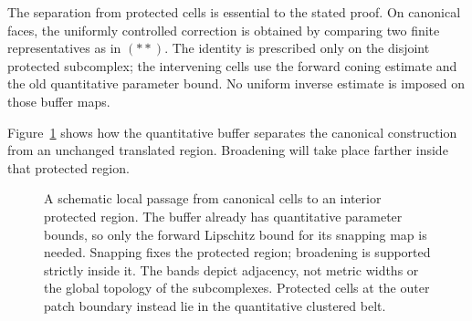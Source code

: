 \documentclass[11pt]{article}
\numberwithin{equation}{section}
\theoremstyle{definition}
\theoremstyle{remark}
\newcommand{\Id}{\operatorname{id}}
\begin{document}
The separation from protected cells is essential to the stated
proof.  On canonical faces, the uniformly controlled correction
is obtained by comparing two finite representatives as in $(**)$.
The identity is prescribed only on the disjoint protected
subcomplex; the intervening cells use the forward coning estimate
and the old quantitative parameter bound.  No uniform inverse
estimate is imposed on those buffer maps.

Figure~\ref{ms:fig-protected-buffers} shows how the quantitative buffer
separates the canonical construction from an unchanged translated
region.  Broadening will take place farther inside that protected
region.

\begin{figure}[htbp]
\centering
{}
\caption{A schematic local passage from canonical cells to an interior
protected region.  The buffer already has quantitative parameter bounds,
so only the forward Lipschitz bound for its snapping map is needed.
Snapping fixes the protected region; broadening is supported strictly
inside it.  The bands depict adjacency, not metric widths or the global
topology of the subcomplexes.  Protected cells at the outer patch boundary
instead lie in the quantitative clustered belt.}
\label{ms:fig-protected-buffers}
\end{figure}
\end{document}
